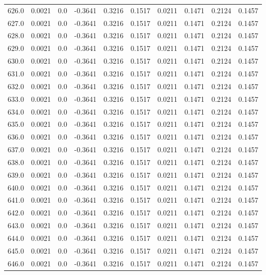 \begin{longtable}{lrrrrrrrrr}
626.0 & 0.0021 & 0.0 & -0.3641 & 0.3216 & 0.1517 & 0.0211 & 0.1471 & 0.2124 & 0.1457 \\
627.0 & 0.0021 & 0.0 & -0.3641 & 0.3216 & 0.1517 & 0.0211 & 0.1471 & 0.2124 & 0.1457 \\
628.0 & 0.0021 & 0.0 & -0.3641 & 0.3216 & 0.1517 & 0.0211 & 0.1471 & 0.2124 & 0.1457 \\
629.0 & 0.0021 & 0.0 & -0.3641 & 0.3216 & 0.1517 & 0.0211 & 0.1471 & 0.2124 & 0.1457 \\
630.0 & 0.0021 & 0.0 & -0.3641 & 0.3216 & 0.1517 & 0.0211 & 0.1471 & 0.2124 & 0.1457 \\
631.0 & 0.0021 & 0.0 & -0.3641 & 0.3216 & 0.1517 & 0.0211 & 0.1471 & 0.2124 & 0.1457 \\
632.0 & 0.0021 & 0.0 & -0.3641 & 0.3216 & 0.1517 & 0.0211 & 0.1471 & 0.2124 & 0.1457 \\
633.0 & 0.0021 & 0.0 & -0.3641 & 0.3216 & 0.1517 & 0.0211 & 0.1471 & 0.2124 & 0.1457 \\
634.0 & 0.0021 & 0.0 & -0.3641 & 0.3216 & 0.1517 & 0.0211 & 0.1471 & 0.2124 & 0.1457 \\
635.0 & 0.0021 & 0.0 & -0.3641 & 0.3216 & 0.1517 & 0.0211 & 0.1471 & 0.2124 & 0.1457 \\
636.0 & 0.0021 & 0.0 & -0.3641 & 0.3216 & 0.1517 & 0.0211 & 0.1471 & 0.2124 & 0.1457 \\
637.0 & 0.0021 & 0.0 & -0.3641 & 0.3216 & 0.1517 & 0.0211 & 0.1471 & 0.2124 & 0.1457 \\
638.0 & 0.0021 & 0.0 & -0.3641 & 0.3216 & 0.1517 & 0.0211 & 0.1471 & 0.2124 & 0.1457 \\
639.0 & 0.0021 & 0.0 & -0.3641 & 0.3216 & 0.1517 & 0.0211 & 0.1471 & 0.2124 & 0.1457 \\
640.0 & 0.0021 & 0.0 & -0.3641 & 0.3216 & 0.1517 & 0.0211 & 0.1471 & 0.2124 & 0.1457 \\
641.0 & 0.0021 & 0.0 & -0.3641 & 0.3216 & 0.1517 & 0.0211 & 0.1471 & 0.2124 & 0.1457 \\
642.0 & 0.0021 & 0.0 & -0.3641 & 0.3216 & 0.1517 & 0.0211 & 0.1471 & 0.2124 & 0.1457 \\
643.0 & 0.0021 & 0.0 & -0.3641 & 0.3216 & 0.1517 & 0.0211 & 0.1471 & 0.2124 & 0.1457 \\
644.0 & 0.0021 & 0.0 & -0.3641 & 0.3216 & 0.1517 & 0.0211 & 0.1471 & 0.2124 & 0.1457 \\
645.0 & 0.0021 & 0.0 & -0.3641 & 0.3216 & 0.1517 & 0.0211 & 0.1471 & 0.2124 & 0.1457 \\
646.0 & 0.0021 & 0.0 & -0.3641 & 0.3216 & 0.1517 & 0.0211 & 0.1471 & 0.2124 & 0.1457 \\

\end{longtable}
